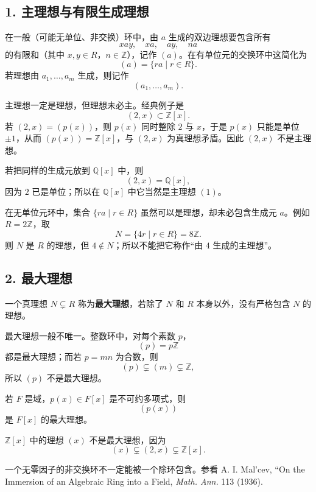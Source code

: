 \subsection*{1. 主理想与有限生成理想}

在一般（可能无单位、非交换）环中，由 $a$ 生成的双边理想要包含所有
\[
xay,
\quad xa,
\quad ay,
\quad na
\]
的有限和（其中 $x,y\in R$，$n\in\mathbb Z$），记作 $(a)$。在有单位元的交换环中这简化为
\[
(a)=\{ra\mid r\in R\}.
\]
若理想由 $a_1,\ldots,a_m$ 生成，则记作
\[
(a_1,\ldots,a_m).
\]

主理想一定是理想，但理想未必主。经典例子是
\[
(2,x)\subset\mathbb Z[x].
\]
若 $(2,x)=(p(x))$，则 $p(x)$ 同时整除 $2$ 与 $x$，于是 $p(x)$ 只能是单位 $\pm1$，从而 $(p(x))=\mathbb Z[x]$，与 $(2,x)$ 为真理想矛盾。因此 $(2,x)$ 不是主理想。

若把同样的生成元放到 $\mathbb Q[x]$ 中，则
\[
(2,x)=\mathbb Q[x],
\]
因为 $2$ 已是单位；所以在 $\mathbb Q[x]$ 中它当然是主理想 $(1)$。

在无单位元环中，集合 $\{ra\mid r\in R\}$ 虽然可以是理想，却未必包含生成元 $a$。例如 $R=2\mathbb Z$，取
\[
N=\{4r\mid r\in R\}=8\mathbb Z.
\]
则 $N$ 是 $R$ 的理想，但 $4\notin N$；所以不能把它称作“由 $4$ 生成的主理想”。

\subsection*{2. 最大理想}

一个真理想 $N\subsetneq R$ 称为\textbf{最大理想}，若除了 $N$ 和 $R$ 本身以外，没有严格包含 $N$ 的理想。

最大理想一般不唯一。整数环中，对每个素数 $p$，
\[
(p)=p\mathbb Z
\]
都是最大理想；而若 $p=mn$ 为合数，则
\[
(p)\subsetneq(m)\subsetneq\mathbb Z,
\]
所以 $(p)$ 不是最大理想。

若 $F$ 是域，$p(x)\in F[x]$ 是不可约多项式，则
\[
(p(x))
\]
是 $F[x]$ 的最大理想。

$\mathbb Z[x]$ 中的理想 $(x)$ 不是最大理想，因为
\[
(x)\subsetneq(2,x)\subsetneq\mathbb Z[x].
\]

一个无零因子的非交换环不一定能被一个除环包含。参看 A. I. Mal'cev, ``On the Immersion of an Algebraic Ring into a Field, \emph{Math. Ann.} 113 (1936).

